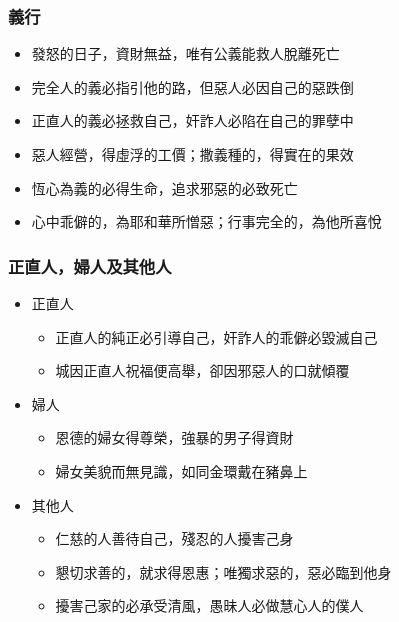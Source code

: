 \subsubsection{義行 }
\begin{itemize}
\itemsep-.45em  
\item 發怒的日子，資財無益，唯有公義能救人脫離死亡
\item 完全人的義必指引他的路，但惡人必因自己的惡跌倒
\item 正直人的義必拯救自己，奸詐人必陷在自己的罪孽中
\item 惡人經營，得虛浮的工價；撒義種的，得實在的果效
\item 恆心為義的必得生命，追求邪惡的必致死亡
\item 心中乖僻的，為耶和華所憎惡；行事完全的，為他所喜悅
\end{itemize}
\subsubsection{正直人，婦人及其他人}
\begin{itemize}
\itemsep-.45em
\item 正直人
\begin{itemize}
\itemsep-.45em   
\item 正直人的純正必引導自己，奸詐人的乖僻必毀滅自己
\item 城因正直人祝福便高舉，卻因邪惡人的口就傾覆
\end{itemize}
\item 婦人
\begin{itemize}
\itemsep-.45em   
\item 恩德的婦女得尊榮，強暴的男子得資財 
\item 婦女美貌而無見識，如同金環戴在豬鼻上
\end{itemize}
\item 其他人
\begin{itemize}
\itemsep-.45em  
\item 仁慈的人善待自己，殘忍的人擾害己身
\item 懇切求善的，就求得恩惠；唯獨求惡的，惡必臨到他身
\item 擾害己家的必承受清風，愚昧人必做慧心人的僕人
\end{itemize} 
\end{itemize}
